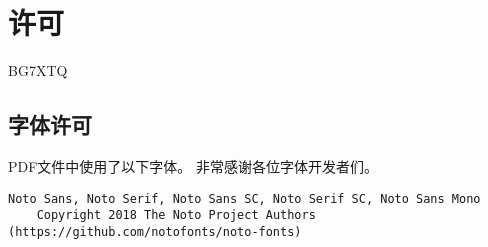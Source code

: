 \chapter*{许可}

\noindent {} BG7XTQ

\section*{字体许可}

\noindent PDF文件中使用了以下字体。
非常感谢各位字体开发者们。

\begin{verbatim}
Noto Sans, Noto Serif, Noto Sans SC, Noto Serif SC, Noto Sans Mono
    Copyright 2018 The Noto Project Authors (https://github.com/notofonts/noto-fonts)
\end{verbatim}
